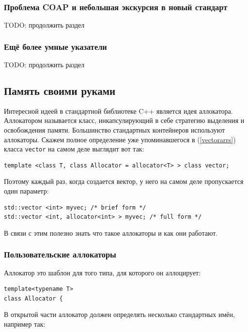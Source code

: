 \documentclass[a4paper,12pt,oneside]{article}
\begin{document}
\subsubsection{Проблема COAP и небольшая экскурсия в новый стандарт}\label{COAP}

TODO: продолжить раздел

\subsubsection{Ещё более умные указатели}

TODO: продолжить раздел

\subsection{Память своими руками}

Интересной идеей в стандартной библиотеке C++ является идея аллокатора. Аллокатором называется класс, инкапсулирующий в себе стратегию выделения и освобождения памяти. Большинство стандартных контейнеров используют аллокаторы. Скажем полное определение уже упоминавшегося в (\ref{vectorarrs}) класса \lstinline!vector! на самом деле выглядит вот так:

\begin{lstlisting}
template <class T, class Allocator = allocator<T> > class vector;
\end{lstlisting}

Поэтому каждый раз, когда создается вектор, у него на самом деле пропускается один параметр:

\begin{lstlisting}
std::vector <int> myvec; /* brief form */
std::vector <int, allocator<int> > myvec; /* full form */
\end{lstlisting}

В связи с этим полезно знать что такое аллокаторы и как они работают.

\subsubsection{Пользовательские аллокаторы}

Аллокатор это шаблон для того типа, для которого он аллоцирует:

\begin{lstlisting}
template<typename T>
class Allocator {
\end{lstlisting}

В открытой части аллокатор должен определять несколько стандартных имён, например так:
\end{document}
